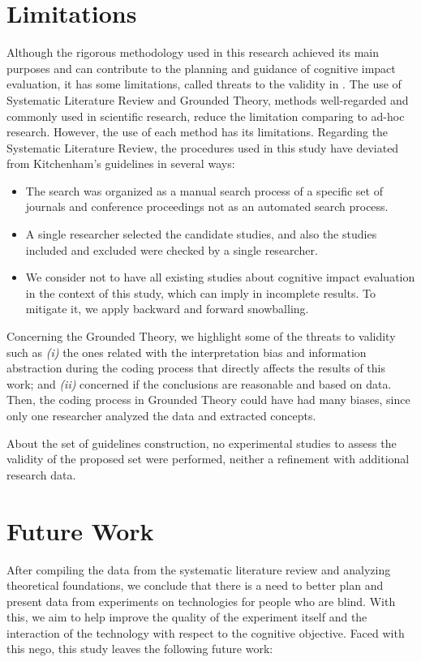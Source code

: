 \section{Limitations}
\label{sec:conclusion-limitations}
Although the rigorous methodology used in this research achieved its main purposes and can contribute to the planning and guidance of cognitive impact evaluation, it has some limitations, called threats to the validity in . The use of Systematic Literature Review and Grounded Theory, methods well-regarded and commonly used in scientific research, reduce the limitation comparing to ad-hoc research. However, the use of each method has its limitations. Regarding the Systematic Literature Review, the procedures used in this study have deviated from Kitchenham’s guidelines \cite{Kitchenham2007} in several ways:
        \begin{itemize}
            \item The search was organized as a manual search process of a specific set of journals and conference proceedings not as an automated search process. 
            \item A single researcher selected the candidate studies, and also the studies included and excluded were checked by a single researcher. 
            \item We consider not to have all existing studies about cognitive impact evaluation in the context of this study, which can imply in incomplete results. To mitigate it, we apply backward and forward snowballing.
        \end{itemize}

Concerning the Grounded Theory, we highlight some of the threats to validity such as \textit{(i)} the ones related with the interpretation bias and information abstraction during the coding process that directly affects the results of this work; and \textit{(ii)} concerned if the conclusions are reasonable and based on data. Then, the coding process in Grounded Theory could have had many biases, since only one researcher analyzed the data and extracted concepts. 

About the set of guidelines construction, no experimental studies to assess the validity of the proposed set were performed, neither a refinement with additional research data.

\section{Future Work}
\label{sec:conclusion-future}
After compiling the data from the systematic literature review and analyzing theoretical foundations, we conclude that there is a need to better plan and present data from experiments on technologies for people who are blind. With this, we aim to help improve the quality of the experiment itself and the interaction of the technology with respect to the cognitive objective. Faced with this nego, this study leaves the following future work:

